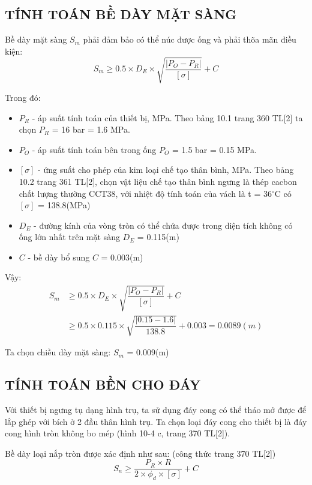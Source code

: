 \subsection{TÍNH TOÁN BỀ DÀY MẶT SÀNG}
Bề dày mặt sàng $S_{m}$ phải đảm bảo có thể núc được ống và phải thõa mãn điều kiện:
\begin{equation*}
	S_{m} \geq 0.5\times D_{E}\times \sqrt{\dfrac{|P_{O} - P_{R}|}{[\sigma]}} + C
\end{equation*}

Trong đó:
\begin{itemize}
	\item $P_{R}$ - áp suất tính toán của thiết bị, MPa. Theo bảng 10.1 trang 360 TL[2] ta chọn $P_{R}$ = 16 bar = 1.6  MPa.
	\item $P_{O}$ - áp suất tính toán bên trong ống $P_{O}$ = 1.5 bar = 0.15 MPa.
	\item $[\sigma]$ - ứng suất cho phép của kim loại chế tạo thân bình, MPa. Theo bảng 10.2 trang 361 TL[2], chọn vật liệu chế tạo thân bình ngưng là thép cacbon chất lượng thường CCT38, với nhiệt độ tính toán của vách là t = 36$^{\circ}$C có $[\sigma]$ = 138.8(MPa)	
	\item $D_{E}$ - đường kính của vòng tròn có thể chứa được trong diện tích không có ống lớn nhất trên mặt sàng $D_{E}$ = 0.115(m)
	\item $C$ - bề dày bổ sung $C$ = 0.003(m)
\end{itemize}

Vậy:
\begin{equation*}
	\begin{split}
		S_{m} &\geq 0.5\times D_{E}\times \sqrt{\dfrac{|P_{O} - P_{R}|}{[\sigma]}} + C\\
		&\geq 0.5 \times 0.115 \times \sqrt{\dfrac{|0.15-1.6|}{138.8}} + 0.003 = 0.0089(m)
	\end{split}
\end{equation*}

Ta chọn chiều dày mặt sàng: $S_{m}$ = 0.009(m)

\subsection{TÍNH TOÁN BỀN CHO ĐÁY}
Với thiết bị ngưng tụ dạng hình trụ, ta sử dụng đáy cong có thể tháo mở được để lắp ghép với bích ở 2 đầu thân hình trụ. Ta chọn loại đáy cong cho thiết bị là đáy cong hình tròn không bo mép (hình 10-4 c, trang 370 TL[2]).

Bề dày loại nắp tròn được xác định như sau: (công thức trang 370 TL[2])
\begin{equation*}
	S_{n} \geq \dfrac{P_{R}\times R}{2\times \phi_{d}\times[\sigma]} + C
\end{equation*}

